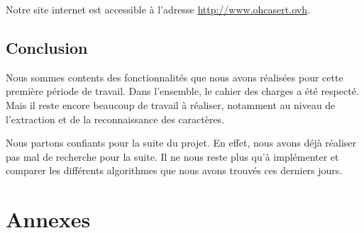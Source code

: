 \documentclass[11pt]{report}
\begin{document}
Notre site internet est accessible à l'adresse \url{http://www.ohcasert.ovh}.

\chapter{Conclusion}

Nous sommes contents des fonctionnalités que nous avons réalisées pour cette première période de travail. Dans l'ensemble, le cahier des charges a été respecté. Mais il reste encore beaucoup de travail à réaliser, notamment au niveau de l'extraction et de la reconnaissance des caractères.

Nous partons confiants pour la suite du projet. En effet, nous avons déjà réaliser pas mal de recherche pour la suite. Il ne nous reste plus qu'à implémenter et comparer les différents algorithmes que nous avons trouvés ces derniers jours.

\newpage
{}
\part*{Annexes}

\newpage
\listoffigures
 
\end{document}

